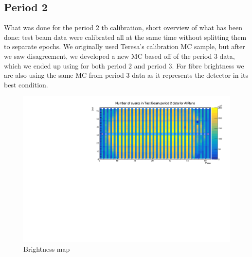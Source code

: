 \documentclass[12pt,a4paper]{article}
\begin{document}
\subsection{Period 2}
What was done for the period 2 tb calibration, short overview of what has been done: test beam data were calibrated all at the same time without splitting them to separate epochs. We originally used Teresa's calibration MC sample, but after we saw disagreement, we developed a new MC based off of the period 3 data, which we ended up using for both period 2 and period 3. For fibre brightness we are also using the same MC from period 3 data as it represents the detector in its best condition.

\begin{figure}[hbtp]
\centering
\includegraphics[width=\textwidth]{Plots/Attenprofs_P2Data_CellPlane_AllRuns.pdf}
\caption{Brightness map}
\end{figure}
\end{document}
